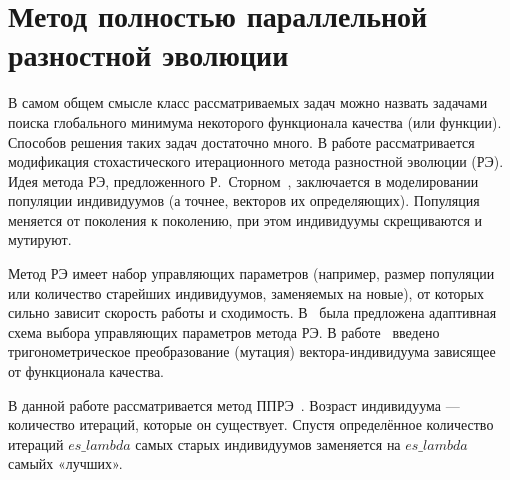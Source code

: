 \chapter{Метод полностью параллельной разностной эволюции} 
\label{chapt1}

В самом общем смысле класс рассматриваемых задач можно назвать задачами 
поиска глобального минимума некоторого функционала качества (или функции). 
Способов решения таких задач достаточно много. В работе рассматривается 
модификация стохастического итерационного метода разностной эволюции (РЭ). 
Идея метода РЭ, предложенного Р.~Сторном~\cite{bib1}, заключается в 
моделировании популяции индивидуумов (а точнее, векторов их определяющих). 
Популяция меняется от поколения к поколению, при этом индивидуумы скрещиваются 
и мутируют. 

Метод РЭ имеет набор управляющих параметров (например, размер популяции 
или количество старейших индивидуумов, заменяемых на новые), от которых сильно 
зависит скорость работы и сходимость. В~\cite{bibZaharie} была предложена 
адаптивная схема выбора управляющих параметров метода РЭ. В работе~\cite{bibTM}
введено тригонометрическое преобразование (мутация) вектора-индивидуума 
зависящее от функционала качества. 

В данной работе рассматривается метод ППРЭ~\cite{bib2,bib5}. 
Возраст индивидуума — количество итераций, которые он существует. 
Спустя определённое количество итераций $es\_lambda$ самых старых
индивидуумов заменяется на $es\_lambda$ самыйх «лучших».

